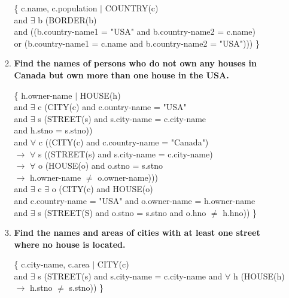 \documentclass[11pt]{article}
\begin{document}
\begin{enumerate}
\begin{enumerate}
	\{ c.name, c.population $\vert$ COUNTRY(c) \\
	and $\exists$ b (BORDER(b) \\
	and ((b.country-name1 = "USA" and b.country-name2 = c.name) \\
	or (b.country-name1 = c.name and b.country-name2 = "USA"))) \}
	
	\item \textbf{Find the names of persons who do not own any houses in Canada but own more than one house in the USA.}
	
	\{ h.owner-name $\vert$ HOUSE(h) \\
	and $\exists$ c (CITY(c) and c.ountry-name = "USA" \\
	and $\exists$ s (STREET(s) and s.city-name = c.city-name \\
	and h.stno = s.stno)) \\
	
	and $\forall$ c ((CITY(c) and c.country-name = "Canada") \\
	$\rightarrow$ $\forall$ s ((STREET(s) and s.city-name = c.city-name) \\
	$\rightarrow$ $\forall$ o (HOUSE(o) and o.stno = s.stno \\
	$\rightarrow$ h.owner-name $\neq$ o.owner-name))) \\

	and $\exists$ c $\exists$ o (CITY(c) and HOUSE(o) \\
	and c.country-name = "USA" and o.owner-name = h.owner-name \\
	and $\exists$ s (STREET(S) and o.stno = s.stno and o.hno $\neq$ h.hno)) \}

	\item \textbf{Find the names and areas of cities with at least one street where no house is located.}

	\{ c.city-name, c.area $\vert$ CITY(c) \\
	and $\exists$ s (STREET(s) and s.city-name = c.city-name
	and $\forall$ h (HOUSE(h) $\rightarrow$ h.stno $\neq$ s.stno)) \}
\end{enumerate}

\end{enumerate}
\end{document}
